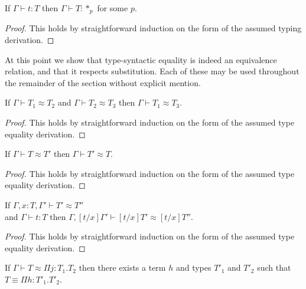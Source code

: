 \begin{lemma}[Regularity]
  If $\Gamma \vdash t:T$ then $\Gamma \vdash T:*_p$ for some $p$.
  \label{lemma:regularity_ssfe}
\end{lemma}
\begin{proof}
  This holds by straightforward induction on the form of the assumed
  typing derivation.
\end{proof}
\noindent
At this point we show that type-syntactic equality is indeed an
equivalence relation, and that it respects substitution.  Each of
these may be used throughout the remainder of the section without
explicit mention.
\begin{lemma}
  \label{lemma:transitivity_of_type_equality_ssfe}
  If $\Gamma \vdash T_1 \approx T_2$ and $\Gamma \vdash T_2 \approx T_3$ then
  $\Gamma \vdash T_1 \approx T_3$.
\end{lemma}
\begin{proof}
  This holds by straightforward induction on the form of the assumed
  type equality derivation.
\end{proof}
\begin{lemma}
  \label{lemma:symmetry_of_type_equality}
  If $\Gamma \vdash T \approx T'$ then $\Gamma \vdash T' \approx T$.
\end{lemma}
\begin{proof}
  This holds by straightforward induction on the form of the assumed
  type equality derivation.
\end{proof}
\begin{lemma}
  \label{lemma:substitution_for_type_equality_ssfe}
  If $\Gamma,x:T,\Gamma' \vdash T' \approx T''$ \\ and $\Gamma \vdash t:T$ then
  $\Gamma,[t/x]\Gamma' \vdash [t/x]T' \approx [t/x]T''$.
\end{lemma}
\begin{proof}
  This holds by straightforward induction on the form of the assumed
  type equality derivation.
\end{proof}
\begin{lemma}
  \label{lemma:pis_are_equal_to_pis_ssfe}
  If $\Gamma \vdash T \approx \Pi j:T_1.T_2$ then there exists a term $h$ and types $T'_1$ and $T'_2$
  such that $T \equiv \Pi h:T'_1.T'_2$.
\end{lemma}
